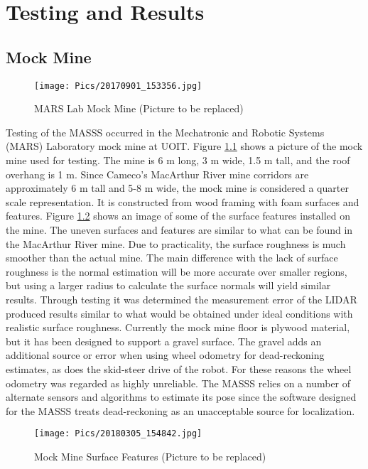 \chapter{Testing and Results}
\label{chap:testing}

\section{Mock Mine}
\label{sec:mine}
\begin{figure}
    \centering
    \texttt{[image: Pics/20170901\_153356.jpg]}
    \caption{MARS Lab Mock Mine (Picture to be replaced)}
    \label{fig:mockmine}
\end{figure}
Testing of the MASSS occurred in the Mechatronic and Robotic Systems (MARS) Laboratory mock mine at UOIT. Figure \ref{fig:mockmine} shows a picture of the mock mine used for testing. The mine is 6 m long, 3 m wide, 1.5 m tall, and the roof overhang is 1 m. Since Cameco's MacArthur River mine corridors are approximately 6 m tall and 5-8 m wide, the mock mine is considered a quarter scale representation. It is constructed from wood framing with foam surfaces and features. Figure \ref{fig:surfacefeature} shows an image of some of the surface features installed on the mine. The uneven surfaces and features are similar to what can be found in the MacArthur River mine. Due to practicality, the surface roughness is much smoother than the actual mine. The main difference with the lack of surface roughness is the normal estimation will be more accurate over smaller regions, but using a larger radius to calculate the surface normals will yield similar results. Through testing it was determined the measurement error of the LIDAR produced results similar to what would be obtained under ideal conditions with realistic surface roughness. Currently the mock mine floor is plywood material, but it has been designed to support a gravel surface. The gravel adds an additional source or error when using wheel odometry for dead-reckoning estimates, as does the skid-steer drive of the robot. For these reasons the wheel odometry was regarded as highly unreliable. The MASSS relies on a number of alternate sensors and algorithms to estimate its pose since the software designed for the MASSS treats dead-reckoning as an unacceptable source for localization.\\
\begin{figure}
    \centering
    \texttt{[image: Pics/20180305\_154842.jpg]}
    \caption{Mock Mine Surface Features (Picture to be replaced)}
    \label{fig:surfacefeature}
\end{figure}
